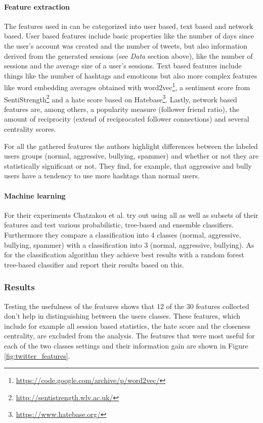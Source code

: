 \documentclass{proseminar}
\begin{document}
\paragraph{Feature extraction} The features used in \cite{Twitter:2017} can be categorized into user based, text based and network based. User based features include basic properties like the number of days since the user's account was created and the number of tweets, but also information derived from the generated sessions (see \emph{Data} section above), like the number of sessions and the average size of a user's sessions. Text based features include things like the number of hashtags and emoticons but also more complex features like word embedding averages obtained with word2vec\footnote{\url{https://code.google.com/archive/p/word2vec/}}, a sentiment score from SentiStrength\footnote{\url{http://sentistrength.wlv.ac.uk/}} and a hate score based on Hatebase\footnote{\url{https://www.hatebase.org/}}. Lastly, network based features are, among others, a popularity measure (follower friend ratio), the amount of reciprocity (extend of reciprocated follower connections) and several centrality scores.

For all the gathered features the authors highlight differences between the labeled users groups (normal, aggressive, bullying, spammer) and whether or not they are statistically significant or not. They find, for example, that aggressive and bully users have a tendency to use more hashtags than normal users.


\paragraph{Machine learning} For their experiments Chatzakou et al. try out using all as well as subsets of their features and test various probabilistic, tree-based and ensemble classifiers. Furthermore they compare a classification into 4 classes (normal, aggressive, bullying, spammer) with a classification into 3 (normal, aggressive, bullying). As for the classification algorithm they achieve best results with a random forest tree-based classifier and report their results based on this.

\subsubsection{Results} Testing the usefulness of the features shows that 12 of the 30 features collected don't help in distinguishing between the users classes. These features, which include for example all session based statistics, the hate score and the closeness centrality, are excluded from the analysis. The features that were most useful for each of the two classes settings and their information gain are shown in Figure \ref{fig:twitter_features}.
\end{document}
